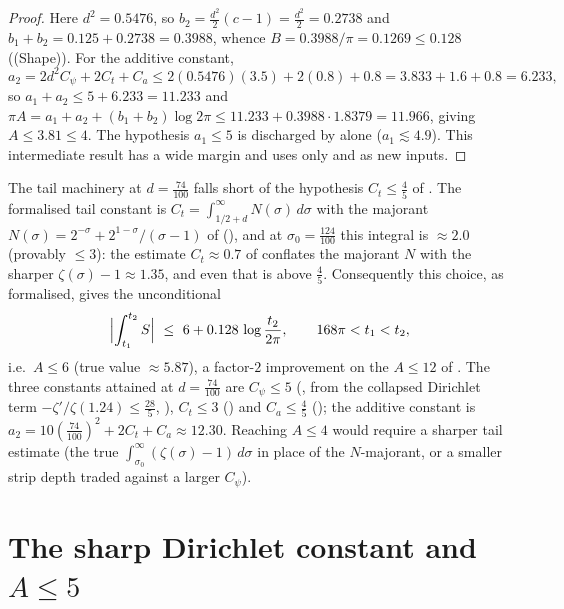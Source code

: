 \begin{proof}
Here $d^2=0.5476$, so $b_2=\tfrac{d^2}2(c-1)=\tfrac{d^2}2=0.2738$ and
$b_1+b_2=0.125+0.2738=0.3988$, whence $B=0.3988/\pi=0.1269\le0.128$
(\textup{(Shape)}). For the additive constant,
\[
  a_2=2d^2C_\psi+2C_t+C_a\le2(0.5476)(3.5)+2(0.8)+0.8=3.833+1.6+0.8=6.233,
\]
so $a_1+a_2\le5+6.233=11.233$ and
$\pi A=a_1+a_2+(b_1+b_2)\log2\pi\le11.233+0.3988\cdot1.8379=11.966$, giving
$A\le3.81\le4$. The hypothesis $a_1\le5$ is discharged by 
alone ($a_1\lesssim4.9$). This intermediate result has a wide margin and uses only
 and  as new inputs.
\end{proof}

\begin{remark}[Formalised outcome at $c=2$, $d=\tfrac{74}{100}$]
\label{rem:ls_p1_correction}
\leanok
The tail machinery at $d=\tfrac{74}{100}$ falls short of the hypothesis $C_t\le\tfrac45$
of . The formalised tail constant is
$C_t=\int_{1/2+d}^\infty N(\sigma)\,d\sigma$ with the majorant
$N(\sigma)=2^{-\sigma}+2^{1-\sigma}/(\sigma-1)$ of 
(), and at $\sigma_0=\tfrac{124}{100}$ this
integral is $\approx2.0$ (provably $\le 3$): the estimate $C_t\approx0.7$ of
 conflates the majorant $N$ with the sharper $\zeta(\sigma)-1\approx1.35$,
and even that is above $\tfrac45$. Consequently this choice, as formalised, gives the
unconditional
\[
  \Bigl|\int_{t_1}^{t_2}S\Bigr|\ \le\ 6+0.128\,\log\frac{t_2}{2\pi},
  \qquad 168\pi<t_1<t_2,
\]
i.e.\ $A\le6$ (true value $\approx5.87$), a factor-$2$ improvement on the $A\le12$ of
. The three constants attained at $d=\tfrac{74}{100}$ are
$C_\psi\le5$ (, from the collapsed
Dirichlet term $-\zeta'/\zeta(1.24)\le\tfrac{28}5$,
), $C_t\le3$
() and $C_a\le\tfrac45$
(); the additive constant is $a_2=10(\tfrac{74}{100})^2+2C_t+C_a\approx12.30$.
Reaching $A\le4$ would require a sharper tail estimate (the true
$\int_{\sigma_0}^\infty(\zeta(\sigma)-1)\,d\sigma$ in place of the $N$-majorant, or a smaller strip
depth traded against a larger $C_\psi$).
\end{remark}

\section{The sharp Dirichlet constant and \texorpdfstring{$A\le5$}{A<=5}}
\label{sec:ls_five}

